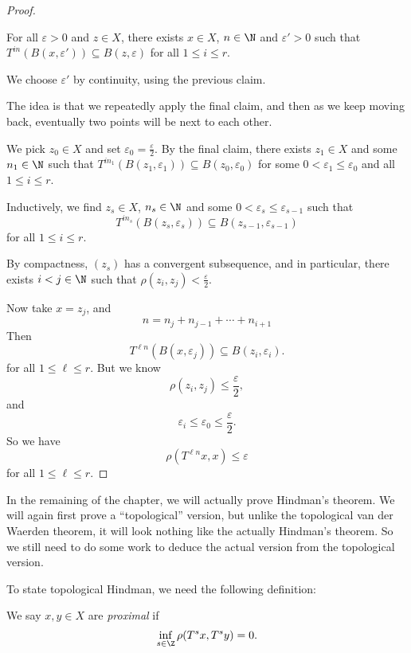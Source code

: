 \documentclass[a4paper]{article}
\begin{document}
\begin{proof}
  \begin{claim}
    For all $\varepsilon > 0$ and $z \in X$, there exists $x \in X$, $n \in \N$ and $\varepsilon' > 0$ such that $T^{in}(B(x, \varepsilon')) \subseteq B(z, \varepsilon)$ for all $1 \leq i \leq r$.
  \end{claim}
  We choose $\varepsilon'$ by continuity, using the previous claim.

  \separator

  The idea is that we repeatedly apply the final claim, and then as we keep moving back, eventually two points will be next to each other.

  We pick $z_0 \in X$ and set $\varepsilon_0 = \frac{\varepsilon}{2}$. By the final claim, there exists $z_1 \in X$ and some $n_1 \in \N$ such that $T^{in_1}(B(z_1, \varepsilon_1)) \subseteq B(z_0, \varepsilon_0)$ for some $0 < \varepsilon_1 \leq \varepsilon_0$ and all $1 \leq i \leq r$.

  Inductively, we find $z_s \in X$, $n_s \in \N$ and some $0 < \varepsilon_s \leq \varepsilon_{s - 1}$ such that
  \[
    T^{in_s}(B(z_s, \varepsilon_s)) \subseteq B(z_{s - 1}, \varepsilon_{s - 1})
  \]
  for all $1 \leq i \leq r$.

  By compactness, $(z_s)$ has a convergent subsequence, and in particular, there exists $i< j \in \N$ such that $\rho(z_i, z_j) < \frac{\varepsilon}{2}$.

  Now take $x = z_j$, and
  \[
    n = n_j + n_{j - 1} + \cdots + n_{i + 1}
  \]
  Then
  \[
    T^{\ell n} (B(x, \varepsilon_j)) \subseteq B(z_i, \varepsilon_i).
  \]
  for all $1 \leq \ell \leq r$. But we know
  \[
    \rho(z_i, z_j) \leq \frac{\varepsilon}{2},
  \]
  and
  \[
    \varepsilon_i \leq \varepsilon_0 \leq \frac{\varepsilon}{2}.
  \]
  So we have
  \[
    \rho(T^{\ell n} x, x) \leq \varepsilon
  \]
  for all $1 \leq \ell \leq r$.
\end{proof}

In the remaining of the chapter, we will actually prove Hindman's theorem. We will again first prove a ``topological'' version, but unlike the topological van der Waerden theorem, it will look nothing like the actually Hindman's theorem. So we still need to do some work to deduce the actual version from the topological version.

To state topological Hindman, we need the following definition:
\begin{defi}
  We say $x, y \in X$ are \emph{proximal} if
  \[
    \inf_{s \in \Z} \rho(T^s x, T^s y) = 0.
  \]
\end{defi}
\end{document}
